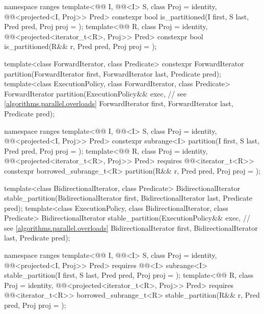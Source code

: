 \begin{codeblock}
{  namespace ranges {
    template<@@ I, @@<I> S, class Proj = identity,
             @@<projected<I, Proj>> Pred>
      constexpr bool is_partitioned(I first, S last, Pred pred, Proj proj = {});
    template<@@ R, class Proj = identity,
             @@<projected<iterator_t<R>, Proj>> Pred>
      constexpr bool is_partitioned(R&& r, Pred pred, Proj proj = {});
  }

  template<class ForwardIterator, class Predicate>
    constexpr ForwardIterator partition(ForwardIterator first,
                                        ForwardIterator last,
                                        Predicate pred);
  template<class ExecutionPolicy, class ForwardIterator, class Predicate>
    ForwardIterator partition(ExecutionPolicy&& exec,           // see \ref{algorithms.parallel.overloads}
                              ForwardIterator first,
                              ForwardIterator last,
                              Predicate pred);

  namespace ranges {
    template<@@ I, @@<I> S, class Proj = identity,
             @@<projected<I, Proj>> Pred>
      constexpr subrange<I>
        partition(I first, S last, Pred pred, Proj proj = {});
    template<@@ R, class Proj = identity,
             @@<projected<iterator_t<R>, Proj>> Pred>
      requires @@<iterator_t<R>>
      constexpr borrowed_subrange_t<R>
        partition(R&& r, Pred pred, Proj proj = {});
  }

  template<class BidirectionalIterator, class Predicate>
    BidirectionalIterator stable_partition(BidirectionalIterator first,
                                           BidirectionalIterator last,
                                           Predicate pred);
  template<class ExecutionPolicy, class BidirectionalIterator, class Predicate>
    BidirectionalIterator stable_partition(ExecutionPolicy&& exec,  // see \ref{algorithms.parallel.overloads}
                                           BidirectionalIterator first,
                                           BidirectionalIterator last,
                                           Predicate pred);

  namespace ranges {
    template<@@ I, @@<I> S, class Proj = identity,
             @@<projected<I, Proj>> Pred>
      requires @@<I>
      subrange<I> stable_partition(I first, S last, Pred pred, Proj proj = {});
    template<@@ R, class Proj = identity,
             @@<projected<iterator_t<R>, Proj>> Pred>
      requires @@<iterator_t<R>>
      borrowed_subrange_t<R> stable_partition(R&& r, Pred pred, Proj proj = {});
  }

}
\end{codeblock}
